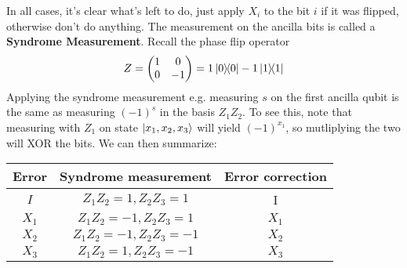 In all cases, it's clear what's left to do, just apply $X_i$ to the bit $i$ if it was flipped, otherwise don't do anything.
The measurement on the ancilla bits is called a \textbf{Syndrome Measurement}.
Recall the phase flip operator
\[ Z = \begin{pmatrix}
    1 & 0 \\ 0 & -1
\end{pmatrix} = 1 \ketbra{0} - 1 \ketbra{1} \]
Applying the syndrome measurement e.g. measuring $s$ on the first ancilla qubit
is the same as measuring $(-1)^s$ in the basis $Z_1 Z_2$. To see this, note that measuring with
$Z_1$ on state $\ket{x_1, x_2, x_3}$ will yield $(-1)^{x_1}$, so mutliplying the two will XOR the bits.
We can then summarize:
\begin{center}
\begin{tabular}{ | c | c | c | }
    Error & Syndrome measurement & Error correction \\ \hline
    $I$ & $Z_1 Z_2 = 1, Z_2 Z_3 = 1$ & I \\ 
    $X_1$ & $Z_1 Z_2 = -1, Z_2 Z_3 = 1$ & $X_1$ \\
    $X_2$ & $Z_1 Z_2 = -1, Z_2 Z_3 = -1$ & $X_2$ \\
    $X_3$ & $Z_1 Z_2 = 1, Z_2 Z_3 = -1$ & $X_3$ \\
\end{tabular}
\end{center}

